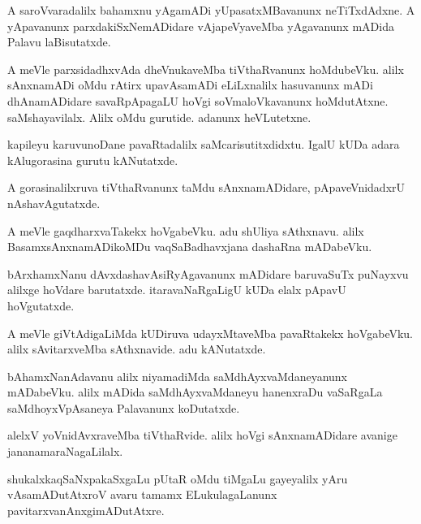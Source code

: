 \documentclass{article}
\begin{document}
\begin{mn}
A saroVvaradalilx bahamxnu yAgamADi yUpasatxMBavanunx neTiTxdAdxne. A yApavanunx 
parxdakiSxNemADidare vAjapeVyaveMba yAgavanunx mADida Palavu laBisutatxde.
\end{mn}

\begin{mn}
A meVle parxsidadhxvAda dheVnukaveMba tiVthaRvanunx hoMdubeVku. alilx sAnxnamADi oMdu rAtirx 
upavAsamADi eLiLxnalilx hasuvanunx mADi dhAnamADidare savaRpApagaLU hoVgi soVmaloVkavanunx 
hoMdutAtxne. saMshayavilalx. Alilx oMdu gurutide. adanunx heVLutetxne.
\end{mn}

\begin{mn}
kapileyu karuvunoDane pavaRtadalilx saMcarisutitxdidxtu. IgalU kUDa adara kAlugorasina gurutu 
kANutatxde.
\end{mn}

\begin{mn}
A gorasinalilxruva tiVthaRvanunx taMdu sAnxnamADidare, pApaveVnidadxrU nAshavAgutatxde.
\end{mn}

\begin{mn}
A meVle gaqdharxvaTakekx hoVgabeVku. adu shUliya sAthxnavu. alilx BasamxsAnxnamADikoMDu 
vaqSaBadhavxjana dashaRna mADabeVku.
\end{mn}

\begin{mn}
bArxhamxNanu dAvxdashavAsiRyAgavanunx mADidare baruvaSuTx puNayxvu alilxge hoVdare barutatxde. 
itaravaNaRgaLigU kUDa elalx pApavU hoVgutatxde.
\end{mn}

\begin{mn}
A meVle giVtAdigaLiMda kUDiruva udayxMtaveMba pavaRtakekx hoVgabeVku. alilx sAvitarxveMba 
sAthxnavide. adu kANutatxde.
\end{mn}

\begin{mn}
bAhamxNanAdavanu alilx niyamadiMda saMdhAyxvaMdaneyanunx mADabeVku. alilx mADida 
saMdhAyxvaMdaneyu hanenxraDu vaSaRgaLa saMdhoyxVpAsaneya Palavanunx koDutatxde.
\end{mn}

\begin{mn}
alelxV yoVnidAvxraveMba tiVthaRvide. alilx hoVgi sAnxnamADidare avanige jananamaraNagaLilalx.
\end{mn}

\begin{mn}
shukalxkaqSaNxpakaSxgaLu pUtaR oMdu tiMgaLu gayeyalilx yAru vAsamADutAtxroV avaru tamamx 
ELukulagaLanunx pavitarxvanAnxgimADutAtxre.
\end{mn}
\end{document}
